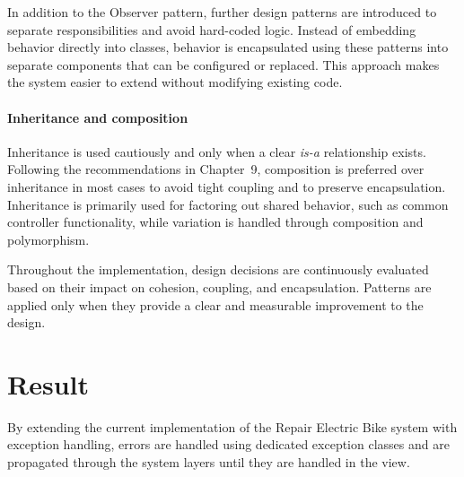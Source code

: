 \documentclass[a4paper]{scrartcl}
\begin{document}
In addition to the Observer pattern, further design patterns are introduced to separate responsibilities and avoid hard-coded logic. Instead of embedding behavior directly into classes, behavior is encapsulated using these patterns into separate components that can be configured or replaced. This approach makes the system easier to extend without modifying existing code.

\paragraph{Inheritance and composition}
Inheritance is used cautiously and only when a clear \textit{is-a} relationship exists. Following the  recommendations in Chapter~9, composition is preferred over inheritance in most cases to avoid tight coupling and to preserve encapsulation. Inheritance is primarily used for factoring out shared behavior, such as common controller functionality, while variation is handled through composition and polymorphism.

Throughout the implementation, design decisions are continuously evaluated based on their impact on cohesion, coupling, and encapsulation. Patterns are applied only when they provide a clear and measurable improvement to the design.

\section{Result}
\label{sec:result}


By extending the current implementation of the Repair Electric Bike system with exception handling, errors are handled using dedicated exception classes and are propagated through the system layers until they are handled in the view.
\end{document}
